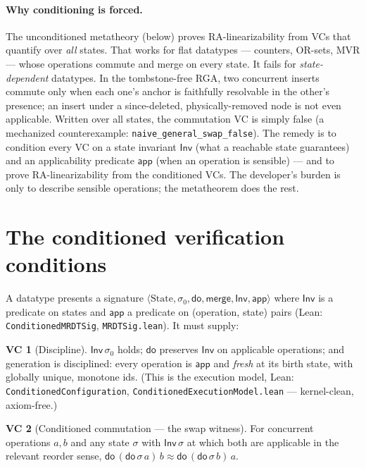 \documentclass[11pt]{article}
\theoremstyle{definition}
\newtheorem{vc}{VC}
\theoremstyle{remark}
\newcommand{\st}{\sigma}
\newcommand{\ini}{\st_0}
\newcommand{\dodo}{\mathsf{do}}
\newcommand{\merge}{\mathsf{merge}}
\newcommand{\eqobs}{\approx}
\newcommand{\Inv}{\mathsf{Inv}}
\newcommand{\app}{\mathsf{app}}
\newcommand{\lean}[1]{\texttt{#1}}
\begin{document}
\paragraph{Why conditioning is forced.} The unconditioned metatheory (below) proves
RA-linearizability from VCs that quantify over \emph{all} states. That works for flat
datatypes --- counters, OR-sets, MVR --- whose operations commute and merge on every state.
It fails for \emph{state-dependent} datatypes. In the tombstone-free RGA, two concurrent
inserts commute only when each one's anchor is faithfully resolvable in the other's presence;
an insert under a since-deleted, physically-removed node is not even applicable. Written over
all states, the commutation VC is simply false (a mechanized counterexample:
\lean{naive\_general\_swap\_false}). The remedy is to condition every VC on a state invariant
$\Inv$ (what a reachable state guarantees) and an applicability predicate $\app$ (when an
operation is sensible) --- and to prove RA-linearizability from the conditioned VCs. The
developer's burden is only to describe sensible operations; the metatheorem does the rest.

\section{The conditioned verification conditions}\label{sec:vcs}

A datatype presents a signature
$\langle \text{State}, \ini, \dodo, \merge, \Inv, \app \rangle$ where $\Inv$ is a predicate
on states and $\app$ a predicate on (operation, state) pairs (Lean:
\lean{ConditionedMRDTSig}, \lean{MRDTSig.lean}). It must supply:

\begin{vc}[Discipline]\label{vc:disc}
$\Inv\,\ini$ holds; $\dodo$ preserves $\Inv$ on applicable operations; and generation is
disciplined: every operation is $\app$ and \emph{fresh} at its birth state, with globally
unique, monotone ids. (This is the execution model, Lean:
\lean{ConditionedConfiguration}, \lean{ConditionedExecutionModel.lean} --- kernel-clean,
axiom-free.)
\end{vc}

\begin{vc}[Conditioned commutation --- the swap witness]\label{vc:comm}
For concurrent operations $a,b$ and any state $\st$ with $\Inv\,\st$ at which both are
applicable in the relevant reorder sense, $\dodo\,(\dodo\,\st\,a)\,b \eqobs
\dodo\,(\dodo\,\st\,b)\,a$.
\end{vc}
\end{document}
